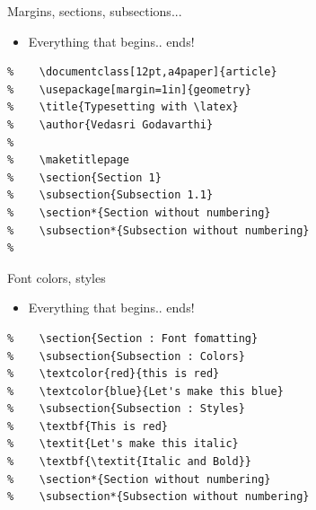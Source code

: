 \begin{frame}[fragile]{Margins, sections, subsections...}
\begin{itemize}
    \item Everything that begins.. ends!
\end{itemize}
\begin{verbatim}
%    \documentclass[12pt,a4paper]{article} 
%    \usepackage[margin=1in]{geometry}
%    \title{Typesetting with \latex}
%    \author{Vedasri Godavarthi}
%     
%    \maketitlepage
%    \section{Section 1}
%    \subsection{Subsection 1.1}
%    \section*{Section without numbering}
%    \subsection*{Subsection without numbering}
%    
\end{verbatim}
\end{frame}

\begin{frame}[fragile]{Font colors, styles}
\begin{itemize}
    \item Everything that begins.. ends!
\end{itemize}
\begin{verbatim}
%    \section{Section : Font fomatting}
%    \subsection{Subsection : Colors}
%    \textcolor{red}{this is red}
%    \textcolor{blue}{Let's make this blue}
%    \subsection{Subsection : Styles}
%    \textbf{This is red}
%    \textit{Let's make this italic}
%    \textbf{\textit{Italic and Bold}}
%    \section*{Section without numbering}
%    \subsection*{Subsection without numbering}
\end{verbatim}
\end{frame}


